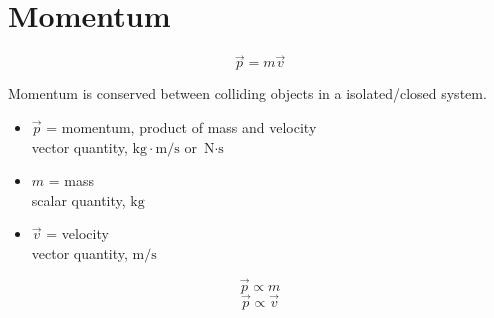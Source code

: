 \documentclass[a4paper,12pt]{article}
\begin{document}
\pagebreak

\section{Momentum}
\Large $$\vec{p} = m\vec{v}$$ \normalsize

Momentum is conserved between colliding objects in a isolated/closed system.

\begin{itemize}
    \item{$\vec{p}$ = momentum, product of mass and velocity\\vector quantity, $\si{\kg\cdot\m/\s}$ or $\si{\N\cdot\s}$}
    \item{$m$ = mass\\scalar quantity, $\si{\kg}$}
    \item{$\vec{v}$ = velocity\\vector quantity, $\si{\m/\s}$}
\end{itemize}
\Large
$$\vec{p} \propto m$$
$$\vec{p} \propto \vec{v}$$
\normalsize
\end{document}
